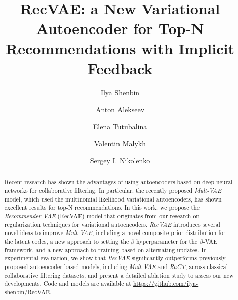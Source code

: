 \documentclass[sigconf,authorversion]{acmart}
\begin{document}
\title{RecVAE: a New Variational Autoencoder for Top-N Recommendations with Implicit Feedback}

\author{Ilya Shenbin}

\author{Anton Alekseev}

\author{Elena Tutubalina}

\author{Valentin Malykh}

\author{Sergey I. Nikolenko}

\renewcommand{\shortauthors}{Shenbin et al.}

\begin{abstract}
Recent research has shown the advantages of using autoencoders based on deep neural networks for collaborative filtering. In particular, the recently proposed \emph{Mult-VAE} model, which used the multinomial likelihood variational autoencoders, has shown excellent results for top-N recommendations. In this work, we propose the \emph{Recommender VAE} (RecVAE) model that originates from our research on regularization techniques for variational autoencoders. \emph{RecVAE} introduces several novel ideas to improve \emph{Mult-VAE}, including a novel composite prior distribution for the latent codes, a new approach to setting the $\beta$ hyperparameter for the $\beta$-VAE framework, and a new approach to training based on alternating updates. In experimental evaluation, we show that \emph{RecVAE} significantly outperforms previously proposed autoencoder-based models, including \emph{Mult-VAE} and \emph{RaCT}, across classical collaborative filtering datasets, and present a detailed ablation study to assess our new developments. Code and models are available at \url{https://github.com/ilya-shenbin/RecVAE}.
\end{abstract}
\end{document}
